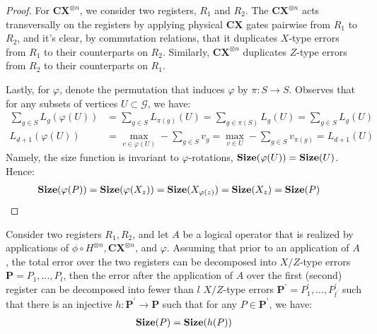 \begin{proof}
For $\mathbf{CX}^{\otimes n}$, we consider two registers, $R_1$ and $R_2$. The $\mathbf{CX}^{\otimes n}$ acts transversally on the registers by applying physical $\mathbf{CX}$ gates pairwise from $R_1$ to $R_2$, and it's clear, by commutation relations, that it duplicates $X$-type errors from $R_1$ to their counterparts on $R_2$. Similarly, $\mathbf{CX}^{\otimes n}$ duplicates $Z$-type errors from $R_2$ to their counterparts on $R_1$.


Lastly, for $\varphi$, denote the permutation that induces $\varphi$ by $\pi : S \rightarrow S$. Observes that for any subsets of vertices $U\subset \mathcal{G}$, we have:   
\begin{equation*}
  \begin{split}
    \sum_{g \in S}L_{g}(\varphi(U) )  &= \sum_{g \in S}L_{\pi(g)}(U ) = \sum_{g \in \pi(S)}L_{g}(U ) =\sum_{g \in S}L_{g}(U ) \\
    L_{d+1}(\varphi(U) ) &= \max_{v \in \varphi(U) } - \sum_{g \in S} v_{g} = \max_{v \in U } - \sum_{g \in S} v_{\pi(g)} = L_{d+1}(U)
  \end{split}
\end{equation*}
Namely, the size function is invariant to $\varphi$-rotations, $\mathbf{Size}(\varphi(U)) = \mathbf{Size}(U)$. Hence:
\begin{equation*}
  \begin{split}
    \mathbf{Size}( \varphi (P) ) &= \mathbf{Size}( \varphi (X_{z}) ) = \mathbf{Size}( X_{\varphi(z)} ) = \mathbf{Size}( X_{z} ) = \mathbf{Size}( P )
  \end{split}
\end{equation*}
\end{proof}

\begin{corollary}
Consider two registers $R_{1}, R_{2}$, and let $A$ be a logical operator that is realized by applications of $\phi \circ H^{\otimes n}, \mathbf{CX}^{\otimes n}$, and $\varphi$. Assuming that prior to an application of $A$, the total error over the two registers can be decomposed into $X/Z$-type errors $\mathbf{P} = P_{1}, \ldots, P_{l}$, then the error after the application of $A$ over the first (second) register can be decomposed into fewer than $l$ $X/Z$-type errors $\mathbf{P^{\prime}} = P^{\prime}_{1}, \ldots, P^{\prime}_{l^{\prime}}$ such that there is an injective $h : \mathbf{P^{\prime}} \rightarrow \mathbf{P}$ such that for any $P \in \mathbf{P^{\prime}}$, we have:
  \begin{equation*}
    \begin{split}
      \mathbf{Size}(P) = \mathbf{Size}( h(P) )
    \end{split}
  \end{equation*}
\end{corollary}
